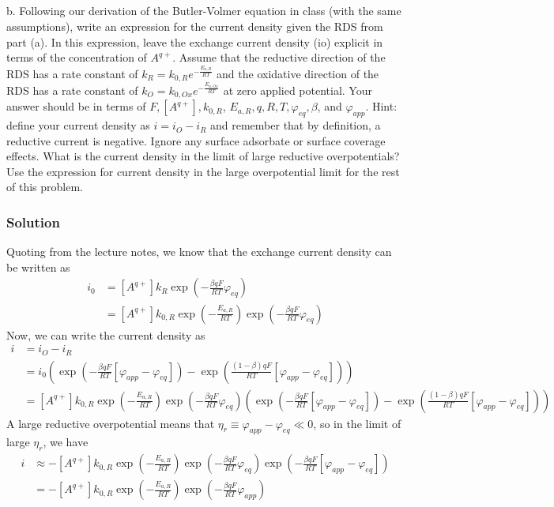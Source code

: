 \documentclass[12pt]{article}
\begin{document}
\subsection{}
b. Following our derivation of the Butler-Volmer equation in class (with the same assumptions), write an expression for the current density given the RDS from part (a). In this expression, leave the exchange current density (io) explicit in terms of the concentration of $A^{q+}$. Assume that the reductive direction of the RDS has a rate constant of $k_{R}=k_{0, R} e^{-\frac{E_{a, R}}{R T}}$ and the oxidative direction of the RDS has a rate constant of $k_{O}= k_{0, O x} e^{-\frac{E_{a, O x}}{R T}}$ at zero applied potential. Your answer should be in terms of $F,\left[A^{q+}\right], k_{0, R}$, $E_{a, R}, q, R, T, \varphi_{e q}, \beta$, and $\varphi_{a p p}$. Hint: define your current density as $i=i_{O}-i_{R}$ and remember that by definition, a reductive current is negative. Ignore any surface adsorbate or surface coverage effects. What is the current density in the limit of large reductive overpotentials? Use the expression for current density in the large overpotential limit for the rest of this problem.\\
\subsubsection{Solution}
Quoting from the lecture notes, we know that the exchange current density can be written as
\begin{align}
    i_0 &= [A^{q+}] k_{R} \exp \left( -\frac{\beta q F}{RT} \varphi_{eq} \right) \\
&= [A^{q+}] k_{0,R} \exp \left( -\frac{E_{a,R}}{RT} \right) \exp \left( -\frac{\beta q F}{RT} \varphi_{eq} \right)
\end{align}
Now, we can write the current density as
\begin{align}
    i &= i_O - i_R \\
&= i_0 \left( \exp \left( -\frac{\beta q F}{RT} \left[\varphi_{app} - \varphi_{eq}\right] \right) - \exp \left( \frac{(1-\beta) q F}{RT} \left[\varphi_{app} - \varphi_{eq}\right] \right) \right) \\
&= [A^{q+}] k_{0,R} \exp \left( -\frac{E_{a,R}}{RT} \right) \exp \left( -\frac{\beta q F}{RT} \varphi_{eq} \right) \left( \exp \left( -\frac{\beta q F}{RT} \left[\varphi_{app} - \varphi_{eq}\right] \right) - \exp \left( \frac{(1-\beta) q F}{RT} \left[\varphi_{app} - \varphi_{eq}\right] \right) \right)
\end{align}
A large reductive overpotential means that $\eta_r \equiv \varphi_{app} - \varphi_{eq} \ll 0$, so in the limit of large $\eta_r$, we have
\begin{align}
    i &\approx -[A^{q+}] k_{0,R} \exp \left( -\frac{E_{a,R}}{RT} \right) \exp \left( -\frac{\beta q F}{RT} \varphi_{eq} \right) \exp \left( -\frac{\beta q F}{RT} \left[\varphi_{app} - \varphi_{eq}\right] \right) \\
&= -[A^{q+}] k_{0,R} \exp \left( -\frac{E_{a,R}}{RT} \right)  \exp \left( -\frac{\beta q F}{RT} \varphi_{app} \right)
\end{align}
\end{document}
